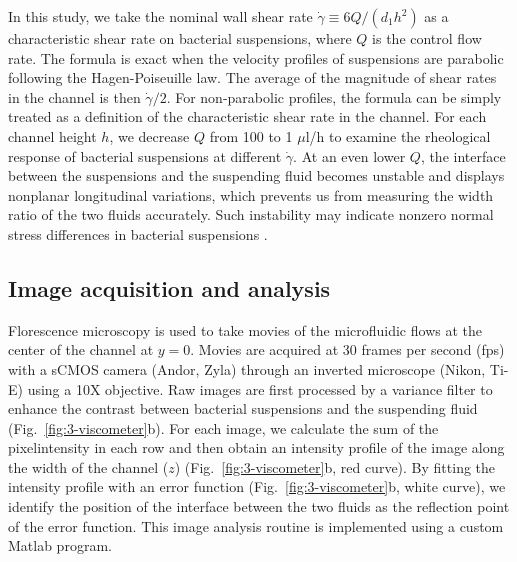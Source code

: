 In this study, we take the nominal wall shear rate $\dot\gamma\equiv 6Q/(d_1h^2)$ as a characteristic shear rate on bacterial suspensions, where $Q$ is the control flow rate. The formula is exact when
the velocity profiles of suspensions are parabolic following the Hagen-Poiseuille law. The average of the magnitude of shear rates in the channel is then $\dot\gamma/2$. For non-parabolic profiles, the formula can be simply treated as a definition of the characteristic shear rate in the channel. For each channel height $h$, we decrease $Q$ from 100 to 1 $\mu$l/h to examine the
rheological response of bacterial suspensions at different $\dot\gamma$. At an even lower $Q$, the interface between the suspensions and the suspending fluid becomes unstable and displays nonplanar
longitudinal variations, which prevents us from measuring the width ratio of the two fluids accurately. Such instability may indicate nonzero normal stress differences in bacterial suspensions \cite{Hinch1992, Brady2002, Saintillan2010}.

\subsection{Image acquisition and analysis}
Florescence microscopy is used to take movies of the microfluidic flows at the center of the channel at $y = 0$. Movies are acquired at 30 frames per second (fps) with a sCMOS camera (Andor, Zyla) through an inverted microscope (Nikon, Ti-E) using a 10X objective. Raw images are first processed by a variance filter to enhance the contrast between bacterial suspensions and the suspending fluid
(Fig.~\ref{fig:3-viscometer}b). For each image, we calculate the sum of the pixelintensity in each row and then obtain an intensity profile of the image along the width of the channel ($z$) (Fig.~\ref{fig:3-viscometer}b, red curve). By fitting the intensity profile with an error function (Fig.~\ref{fig:3-viscometer}b, white curve), we identify the position of the interface between the two fluids as the reflection point of the error function. This image analysis routine is implemented using a custom Matlab program.

